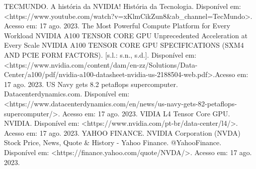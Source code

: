 \documentclass[conference]{IEEEtran}
\begin{document}
\begin{thebibliography}{00}
 TECMUNDO. A história da NVIDIA! História da Tecnologia. Disponível em: <https://www.youtube.com/watch?v=xKlmCikZun8\&ab\_channel=TecMundo>. Acesso em: 17 ago. 2023.
 The Most Powerful Compute Platform for Every Workload NVIDIA A100 TENSOR CORE GPU Unprecedented Acceleration at Every Scale NVIDIA A100 TENSOR CORE GPU SPECIFICATIONS (SXM4 AND PCIE FORM FACTORS). [s.l.: s.n., s.d.]. Disponível em: <https://www.nvidia.com/content/dam/en-zz/Solutions/Data-Center/a100/pdf/nvidia-a100-datasheet-nvidia-us-2188504-web.pdf>.Acesso em: 17 ago. 2023.
 US Navy gets 8.2 petaflops supercomputer. Datacenterdynamics.com. Disponível em: <https://www.datacenterdynamics.com/en/news/us-navy-gets-82-petaflops-supercomputer/>. Acesso em: 17 ago. 2023.
 VIDIA L4 Tensor Core GPU. NVIDIA. Disponível em: <https://www.nvidia.com/pt-br/data-center/l4/>. Acesso em: 17 ago. 2023.
 YAHOO FINANCE. NVIDIA Corporation (NVDA) Stock Price, News, Quote \& History - Yahoo Finance. @YahooFinance. Disponível em: <https://finance.yahoo.com/quote/NVDA/>. Acesso em: 17 ago. 2023.

\end{thebibliography}
\vspace{12pt}
\end{document}
